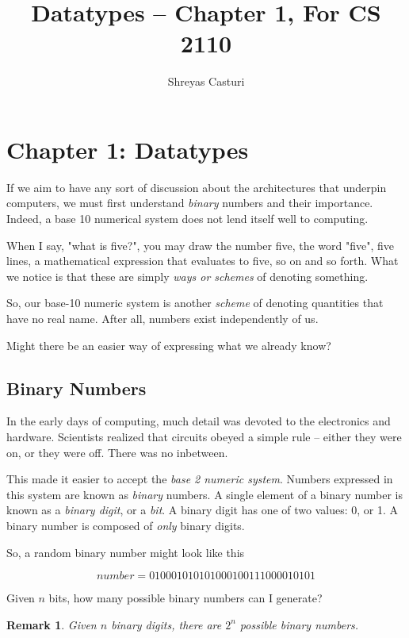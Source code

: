 \documentclass[12pt]{article}
\title{Datatypes -- Chapter 1, For CS 2110}
\author{Shreyas Casturi}
\date{}
\newtheorem*{remark}
{Remark}
\begin{document}
\maketitle

\newpage
\doublespacing
\tableofcontents
\singlespacing

\newpage

\section{Chapter 1: Datatypes}

If we aim to have any sort of discussion about the architectures that underpin computers, we must first
understand \textit{binary} numbers and their importance. Indeed, a base 10 numerical system does not lend itself well to computing.

When I say, "what is five?", you may draw the number five, the word "five", five lines, a mathematical expression that evaluates to five, so on and so forth.
What we notice is that these are simply \textit{ways or schemes} of denoting something.

So, our base-10 numeric system is another \textit{scheme} of denoting quantities that have no real name. After all, numbers exist independently of us.

Might there be an easier way of expressing what we already know?

\subsection{Binary Numbers}

In the early days of computing, much detail was devoted to the electronics and hardware. Scientists realized that circuits
obeyed a simple rule -- either they were on, or they were off. There was no inbetween.

This made it easier to accept the \textit{base 2 numeric system}. Numbers expressed in this system are
known as \textit{binary} numbers. A single element
of a binary number is known as a \textit{binary digit}, or a \textit{bit}. A binary
digit has one of two values: 0, or 1. A binary number
is composed of \textit{only} binary digits.

So, a random binary number might look like this

\[number = 010001010101000100111000010101\]

Given $n$ bits, how many possible binary numbers can I generate?

\begin{remark}
    Given $n$ binary digits, there are $2^n$ possible binary numbers.
\end{remark}
\end{document}
